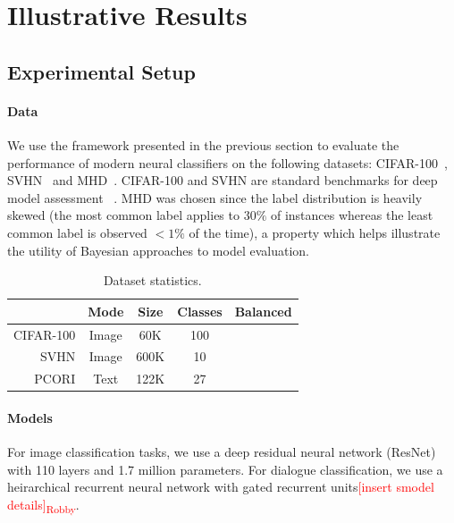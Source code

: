 \documentclass{article}
\newcommand{\cmark}{\ding{51}}%
\newcommand{\xmark}{\ding{55}}%
\newcommand{\robby}[1]{\textcolor{Red}{[#1]\textsubscript{Robby}}}
\begin{document}
 



\section{Illustrative Results}


\subsection{Experimental Setup}

\paragraph{Data} 
We use the framework presented in the previous section to evaluate the performance of modern neural classifiers on the following datasets: 
    CIFAR-100~\cite{krizhevsky2009learning},
    SVHN~\cite{netzer2011reading} and
    MHD~\cite{tai_seale2016mhd}.
CIFAR-100 and SVHN are standard benchmarks for deep model assessment ~\cite{guo2017calibration, hendrycks2019benchmarking}.
MHD was chosen since the label distribution is heavily skewed (the most common label applies to $30\%$ of instances whereas the least common label is observed $<1\%$ of the time), a property which helps illustrate the utility of Bayesian approaches to model evaluation.

\begin{table}[t]
    \centering
    \begin{tabular}{rcccc}
        \toprule
                        & Mode  & Size  & Classes   & Balanced  \\
        \midrule
             CIFAR-100  & Image & 60K   & 100       & \cmark    \\
             SVHN       & Image & 600K  & 10        & \cmark    \\
             PCORI      & Text  & 122K  & 27        & \xmark    \\
        \bottomrule
    \end{tabular}
    \caption{Dataset statistics.}
    \label{tab:datasets}
\end{table}

\paragraph{Models}
For image classification tasks, we use a deep residual neural network (ResNet)~\cite{he2016deep} with 110 layers and 1.7 million parameters.
For dialogue classification, we use a heirarchical recurrent neural network with gated recurrent units\robby{insert smodel details}.
\end{document}

